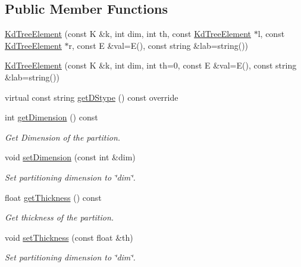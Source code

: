 \subsection*{Public Member Functions}
\begin{DoxyCompactItemize}
\item 
\hyperlink{classbridges_1_1datastructure_1_1_kd_tree_element_a5dd9f121e73a5c0643dfb52401472297}{Kd\+Tree\+Element} (const K \&k, int dim, int th, const \hyperlink{classbridges_1_1datastructure_1_1_kd_tree_element}{Kd\+Tree\+Element} $\ast$l, const \hyperlink{classbridges_1_1datastructure_1_1_kd_tree_element}{Kd\+Tree\+Element} $\ast$r, const E \&val=E(), const string \&lab=string())
\item 
\hyperlink{classbridges_1_1datastructure_1_1_kd_tree_element_a5c8f171b78e65a4e07e93282a0f713f6}{Kd\+Tree\+Element} (const K \&k, int dim, int th=0, const E \&val=E(), const string \&lab=string())
\item 
virtual const string \hyperlink{classbridges_1_1datastructure_1_1_kd_tree_element_a76f6d9bfadfdec09d0a8564aa0e33235}{get\+D\+Stype} () const override
\item 
int \hyperlink{classbridges_1_1datastructure_1_1_kd_tree_element_a0321f13830707107198df2d96ff0bc2d}{get\+Dimension} () const
\begin{DoxyCompactList}\small\item\em Get Dimension of the partition. \end{DoxyCompactList}\item 
void \hyperlink{classbridges_1_1datastructure_1_1_kd_tree_element_a9862bde7b85254224963e23dd9bcee29}{set\+Dimension} (const int \&dim)
\begin{DoxyCompactList}\small\item\em Set partitioning dimension to \char`\"{}dim\char`\"{}. \end{DoxyCompactList}\item 
float \hyperlink{classbridges_1_1datastructure_1_1_kd_tree_element_ae75460d9b4cfbcf013b0376a8f2948ec}{get\+Thickness} () const
\begin{DoxyCompactList}\small\item\em Get thickness of the partition. \end{DoxyCompactList}\item 
void \hyperlink{classbridges_1_1datastructure_1_1_kd_tree_element_ae6c83b12eddf3bafc4b617812b6bbc8e}{set\+Thickness} (const float \&th)
\begin{DoxyCompactList}\small\item\em Set partitioning dimension to \char`\"{}dim\char`\"{}. \end{DoxyCompactList}\item 

\end{DoxyCompactItemize}
